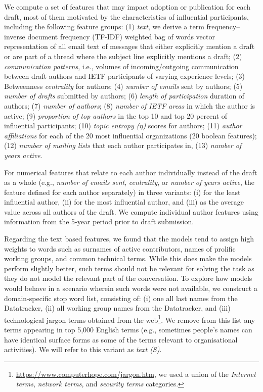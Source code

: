 \documentclass[twocolumn,10pt]{article}
\newcommand{\pb}[1]{\vspace{0.75ex}\noindent{\textbf{#1}}}
\begin{document}
\pb{Methodology:}
We compute a set of features that may impact adoption or publication for
each draft, most of them motivated by the characteristics of influential
participants, including the following feature groups: 
 (1) \emph{text}, we derive a term frequency--inverse document
     frequency (TF-IDF) \cite{salton1983introduction} weighted bag of words vector
     representation of all email text of messages that either explicitly
     mention a draft or are part of a thread where the subject line
     explicitly mentions a draft; 
 (2) \emph{communication patterns}, i.e., volumes of incoming/outgoing communication
     between draft authors and IETF participants of varying experience levels;
 (3) Betweenness \emph{centrality} for authors;
 (4) \emph{number of emails} sent by authors;
 (5) \emph{number of drafts} submitted by authors;
 (6) \emph{length of participation} duration of authors;
 (7) \emph{number of authors};
 (8) \emph{number of IETF areas} in which the author is active;
 (9) \emph{proportion of top authors} in the top 10 and top 20 percent of
     influential participants;
(10) \emph{topic entropy ($\eta$)} scores for authors;
(11) \emph{author affiliations} for each of the 20 most influential
     organizations (20 boolean features);
(12) \emph{number of mailing lists} that each author participates in,
(13) \emph{number of years active}.

For numerical features that relate to each author individually instead of
the draft as a whole (e.g., \emph{number of emails sent}, \emph{centrality},
or \emph{number of years active}, the feature defined for each author
separately) in three variants: (i) for the least influential author, (ii)
for the most influential author, and (iii) as the average value across all
authors of the draft. We compute individual author features using
information from the 5-year period prior to draft submission.

Regarding the text based features, we found that the models tend to assign
high weights to words such as surnames of active contributors, names of
prolific working groups, and common technical terms. While this does make
the models perform slightly better, such terms should not be relevant for
solving the task as they do not model the relevant part of the conversation.
To explore how models would behave in a scenario wherein such words were
not available, we construct a domain-specific stop word list, consisting
of: (i) one all last names from the Datatracker, (ii) all working group
names from the Datatracker, and (iii) technological jargon terms obtained
from the web\footnote{\url{https://www.computerhope.com/jargon.htm}, we
used a union of the \emph{Internet terms}, \emph{network terms}, and
\emph{security terms} categories.}. We remove from this list any terms
appearing in top 5,000 English terms (e.g., sometimes people's names can have
identical surface forms as some of the terms relevant to organisational
activities). We will refer to this variant as \emph{text (S)}. 
\end{document}
